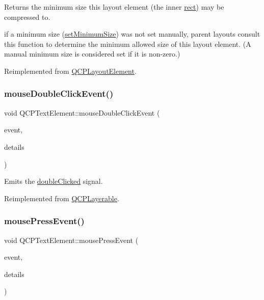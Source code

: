Returns the minimum size this layout element (the inner \hyperlink{class_q_c_p_layout_element_a208effccfe2cca4a0eaf9393e60f2dd4}{rect}) may be compressed to.

if a minimum size (\hyperlink{class_q_c_p_layout_element_a5dd29a3c8bc88440c97c06b67be7886b}{set\+Minimum\+Size}) was not set manually, parent layouts consult this function to determine the minimum allowed size of this layout element. (A manual minimum size is considered set if it is non-\/zero.) 

Reimplemented from \hyperlink{class_q_c_p_layout_element_ab3fdb5c9a5189bb2dac10d4d25329cd8}{Q\+C\+P\+Layout\+Element}.

\mbox{\label{class_q_c_p_text_element_a2272ff775ab385f612e9fd39773de7c0}} 
\subsubsection{\texorpdfstring{mouse\+Double\+Click\+Event()}{mouseDoubleClickEvent()}}
{\footnotesize\ttfamily void Q\+C\+P\+Text\+Element\+::mouse\+Double\+Click\+Event (\begin{DoxyParamCaption}\item[{Q\+Mouse\+Event $\ast$}]{event,  }\item[{const Q\+Variant \&}]{details }\end{DoxyParamCaption})\hspace{0.3cm}{\ttfamily [virtual]}}

Emits the \hyperlink{class_q_c_p_text_element_a9c6fd27ae8a7c3a02df7a6bbd3509e40}{double\+Clicked} signal.

Reimplemented from \hyperlink{class_q_c_p_layerable_a4171e2e823aca242dd0279f00ed2de81}{Q\+C\+P\+Layerable}.

\mbox{\label{class_q_c_p_text_element_ad7b2c98355e3d2f912574b74fcee0574}} 
\subsubsection{\texorpdfstring{mouse\+Press\+Event()}{mousePressEvent()}}
{\footnotesize\ttfamily void Q\+C\+P\+Text\+Element\+::mouse\+Press\+Event (\begin{DoxyParamCaption}\item[{Q\+Mouse\+Event $\ast$}]{event,  }\item[{const Q\+Variant \&}]{details }\end{DoxyParamCaption})\hspace{0.3cm}{\ttfamily [virtual]}}

